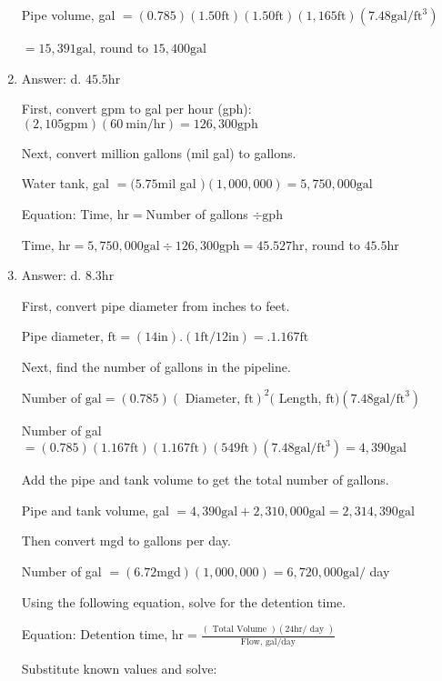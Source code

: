 \documentclass[10pt]{article}
\begin{document}
\begin{enumerate}
Pipe volume, gal $=(0.785)(1.50 \mathrm{ft})(1.50 \mathrm{ft})(1,165 \mathrm{ft})\left(7.48 \mathrm{gal} / \mathrm{ft}^{3}\right)$

$=15,391 \mathrm{gal}$, round to $15,400 \mathrm{gal}$

  \item Answer: d. $45.5 \mathrm{hr}$

First, convert gpm to gal per hour (gph): $(2,105 \mathrm{gpm})(60 \mathrm{~min} / \mathrm{hr})=126,300 \mathrm{gph}$

Next, convert million gallons (mil gal) to gallons.

Water tank, gal $=(5.75 \mathrm{mil}$ gal $)(1,000,000)=5,750,000 \mathrm{gal}$

Equation: Time, $\mathrm{hr}=\mathrm{Number}$ of gallons $\div \mathrm{gph}$

Time, $\mathrm{hr}=5,750,000 \mathrm{gal} \div 126,300 \mathrm{gph}=45.527 \mathrm{hr}$, round to $45.5 \mathrm{hr}$ 

  \item Answer: d. $8.3 \mathrm{hr}$

First, convert pipe diameter from inches to feet.

Pipe diameter, $\mathrm{ft}=(14 \mathrm{in}).(1 \mathrm{ft} / 12 \mathrm{in})=.1.167 \mathrm{ft}$

Next, find the number of gallons in the pipeline.

Number of $\mathrm{gal}=(0.785)(\text { Diameter, } \mathrm{ft})^{2}($ Length, $\mathrm{ft})\left(7.48 \mathrm{gal} / \mathrm{ft}^{3}\right)$

Number of gal $=(0.785)(1.167 \mathrm{ft})(1.167 \mathrm{ft})(549 \mathrm{ft})\left(7.48 \mathrm{gal} / \mathrm{ft}^{3}\right)=4,390 \mathrm{gal}$

Add the pipe and tank volume to get the total number of gallons.

Pipe and tank volume, gal $=4,390 \mathrm{gal}+2,310,000 \mathrm{gal}=2,314,390 \mathrm{gal}$

Then convert mgd to gallons per day.

Number of gal $=(6.72 \mathrm{mgd})(1,000,000)=6,720,000 \mathrm{gal} /$ day

Using the following equation, solve for the detention time.

Equation: Detention time, $\mathrm{hr}=\frac{(\text { Total Volume })(24 \mathrm{hr} / \text { day })}{\text { Flow, gal/day }}$

Substitute known values and solve:


\end{enumerate}
\end{document}
